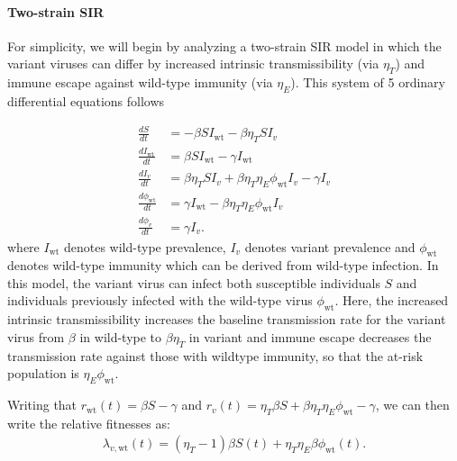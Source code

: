 \documentclass[12pt,oneside,letterpaper]{article}
\newcommand{\wt}{\text{wt}}
\def\tbc#1{\textcolor{purple}{[#1]}}
\begin{document}
\paragraph{Two-strain SIR}%

For simplicity, we will begin by analyzing a two-strain SIR model in which the variant viruses can differ by increased intrinsic transmissibility (via $\eta_{T}$) and immune escape against wild-type immunity (via $\eta_{E}$).
This system of 5 ordinary differential equations follows

\begin{align*}
    \frac{d S}{d t} &= - \beta S I_{\wt} - \beta \eta_{T} S I_{v}\\
    \frac{d I_{\wt}}{dt} &= \beta S I_{\wt} - \gamma I_{\wt}\\
    \frac{d I_{v}}{dt} &= \beta \eta_{T} S I_{v} + \beta \eta_{T} \eta_{E} \phi_{\wt} I_{v} - \gamma I_{v}\\
    \frac{d \phi_{\wt}}{dt} &= \gamma I_{\wt} - \beta \eta_{T} \eta_{E} \phi_{\wt} I_{v}\\
    \frac{d \phi_{v}}{dt} &= \gamma I_{v}.
\end{align*}
where $I_{\wt}$ denotes wild-type prevalence, $I_{v}$ denotes variant prevalence and $\phi_{\wt}$ denotes wild-type immunity which can be derived from wild-type infection.
In this model, the variant virus can infect both susceptible individuals $S$ and individuals previously infected with the wild-type virus $\phi_{\wt}$.
Here, the increased intrinsic transmissibility increases the baseline transmission rate for the variant virus from $\beta$ in wild-type to $\beta \eta_{T}$ in variant and immune escape decreases the transmission rate against those with wildtype immunity, so that the at-risk population is $\eta_{E} \phi_{\wt}$.


Writing that $r_{\wt}(t) = \beta S - \gamma$ and $r_{v}(t) = \eta_{T} \beta  S + \beta \eta_{T} \eta_{E} \phi_{\wt} - \gamma$, we can then write the relative fitnesses as:
\begin{align*}
\lambda_{v,\wt}(t) = (\eta_{T} - 1)\beta S(t) + \eta_{T} \eta_{E} \beta \phi_{\wt}(t).
\end{align*}
\end{document}
